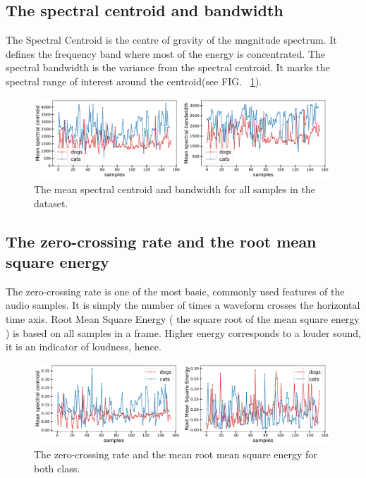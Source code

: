 \documentclass[12pt a4paper]{article}
\numberwithin{equation}{section}
\begin{document}
\subsection{The spectral centroid and bandwidth}

The Spectral Centroid is the centre of gravity of the magnitude spectrum. It defines the frequency band where most of the energy is concentrated. The spectral bandwidth is the variance from the spectral centroid. It marks the spectral range of interest around the centroid(see FIG. ~\ref{fig7}). 

\begin{figure}[H]
\centering
\includegraphics[width=0.99\textwidth]{fig/cen_band.pdf}
\caption{The mean spectral centroid and bandwidth for all samples in the dataset.}
\label{fig7}
\end{figure}

\subsection{The zero-crossing rate and the root mean square energy}

The zero-crossing rate is one of the most basic, commonly used features of the audio samples. It is simply the number of times a waveform crosses the horizontal time axis. Root Mean Square Energy ( the square root of the mean square energy ) is based on all samples in a frame. Higher energy corresponds to a louder sound, it is an indicator of loudness, hence. 

\begin{figure}[H]
\centering
\includegraphics[width=0.99\textwidth]{fig/zer_root.pdf}
\caption{The zero-crossing rate and the mean root mean square energy for both class.}
\label{fig8}
\end{figure}
\end{document}
